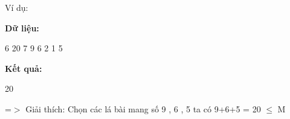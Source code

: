 Ví dụ:
 

\textbf{Dữ liệu: }

6 20 7 9 6 2 1 5

\textbf{Kết quả: }

20

=$>$ Giải thích: Chọn các lá bài mang số 9 , 6 , 5 ta có 9+6+5 = 20  $\le$  M